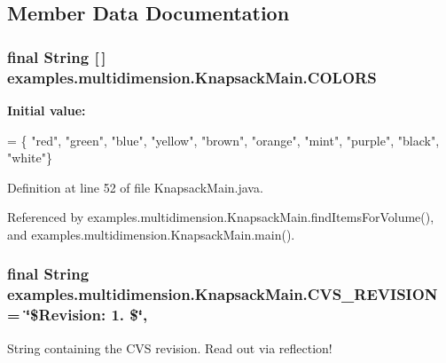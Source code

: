 \subsection{Member Data Documentation}
\hypertarget{classexamples_1_1multidimension_1_1_knapsack_main_a442e9db06b68f6748e7ba23b71d9d7ac}{
\subsubsection[{C\-O\-L\-O\-R\-S}]{\setlength{\rightskip}{0pt plus 5cm}final String \mbox{[}$\,$\mbox{]} examples.\-multidimension.\-Knapsack\-Main.\-C\-O\-L\-O\-R\-S\hspace{0.3cm}{\ttfamily [static]}}}\label{classexamples_1_1multidimension_1_1_knapsack_main_a442e9db06b68f6748e7ba23b71d9d7ac}
{\bfseries Initial value\-:}
\begin{DoxyCode}
= \{
      \textcolor{stringliteral}{"red"}, \textcolor{stringliteral}{"green"}, \textcolor{stringliteral}{"blue"}, \textcolor{stringliteral}{"yellow"}, \textcolor{stringliteral}{"brown"}, \textcolor{stringliteral}{"orange"},
      \textcolor{stringliteral}{"mint"}, \textcolor{stringliteral}{"purple"}, \textcolor{stringliteral}{"black"}, \textcolor{stringliteral}{"white"}\}
\end{DoxyCode}


Definition at line 52 of file Knapsack\-Main.\-java.



Referenced by examples.\-multidimension.\-Knapsack\-Main.\-find\-Items\-For\-Volume(), and examples.\-multidimension.\-Knapsack\-Main.\-main().

\hypertarget{classexamples_1_1multidimension_1_1_knapsack_main_a2bffa782bdc5f8ab8de71ac440e42d30}{
\subsubsection[{C\-V\-S\-\_\-\-R\-E\-V\-I\-S\-I\-O\-N}]{\setlength{\rightskip}{0pt plus 5cm}final String examples.\-multidimension.\-Knapsack\-Main.\-C\-V\-S\-\_\-\-R\-E\-V\-I\-S\-I\-O\-N = \char`\"{}\$Revision\-: 1. \$\char`\"{}\hspace{0.3cm}{\ttfamily [static]}, {\ttfamily [private]}}}\label{classexamples_1_1multidimension_1_1_knapsack_main_a2bffa782bdc5f8ab8de71ac440e42d30}
String containing the C\-V\-S revision. Read out via reflection! 

